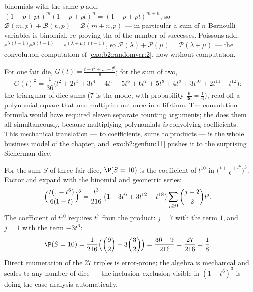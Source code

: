\begin{example}\label{ex:b2:genfun:stability}
 binomials with the same $p$ add: $(1 - p + pt)^m(1 -
p + pt)^n = (1 - p + pt)^{m+n}$, so $\mathcal{B}(m, p) +
\mathcal{B}(n, p) = \mathcal{B}(m + n, p)$ --- in particular a sum
of $n$  Bernoulli variables is binomial, re-proving the
 of the number of successes.  Poissons add:
$e^{\lambda(t-1)}e^{\mu(t-1)} = e^{(\lambda + \mu)(t-1)}$, so
$\mathcal{P}(\lambda) + \mathcal{P}(\mu) = \mathcal{P}(\lambda +
\mu)$ --- the convolution computation of
\cref{exo:b2:randomvar:2}, now without computation.
\end{example}

\begin{example}\label{ex:b2:genfun:twodice}
For one fair die, $G(t) = \frac{t + t^2 + \dots + t^6}{6}$;
for the sum of two,
\[
G(t)^2 = \frac{1}{36}\bigl(t^2 + 2t^3 + 3t^4 + 4t^5 + 5t^6 +
6t^7 + 5t^8 + 4t^9 + 3t^{10} + 2t^{11} + t^{12}\bigr) :
\]
the triangular  of dice sums ($7$ is the mode, with
probability $\frac6{36} = \frac16$), read off a polynomial
square that one multiplies out once in a lifetime. The
convolution formula would have required eleven separate
counting arguments; the  does them all
simultaneously, because multiplying polynomials \emph{is}
convolving coefficients. This mechanical translation ---
 to coefficients, sums to products --- is the whole
business model of the chapter, and
\cref{exo:b2:genfun:11} pushes it to the surprising
Sicherman dice.
\end{example}

\begin{example}\label{ex:b2:genfun:threedice}
For the sum $S$ of three fair dice, $\P(S = 10)$ is the
coefficient of $t^{10}$ in $\bigl(\frac{t + \dots +
t^6}6\bigr)^3$. Factor and expand with the binomial and
geometric series:
\[
\Bigl(\frac{t(1 - t^6)}{6(1 - t)}\Bigr)^{\!3}
= \frac{t^3}{216}\,\bigl(1 - 3t^6 + 3t^{12} -
t^{18}\bigr)\sum_{j\geq0}\binom{j+2}2t^j .
\]
The coefficient of $t^{10}$ requires $t^7$ from the product:
$j = 7$ with the term $1$, and $j = 1$ with the term
$-3t^6$:
\[
\P(S = 10) = \frac{1}{216}\Bigl(\binom92 -
3\binom32\Bigr) = \frac{36 - 9}{216} = \frac{27}{216} =
\frac18 .
\]
Direct enumeration of the $27$ triples is error-prone; the
algebra is mechanical and scales to any number of dice ---
the inclusion--exclusion visible in $(1 - t^6)^3$ is doing
the case analysis automatically.
\end{example}

